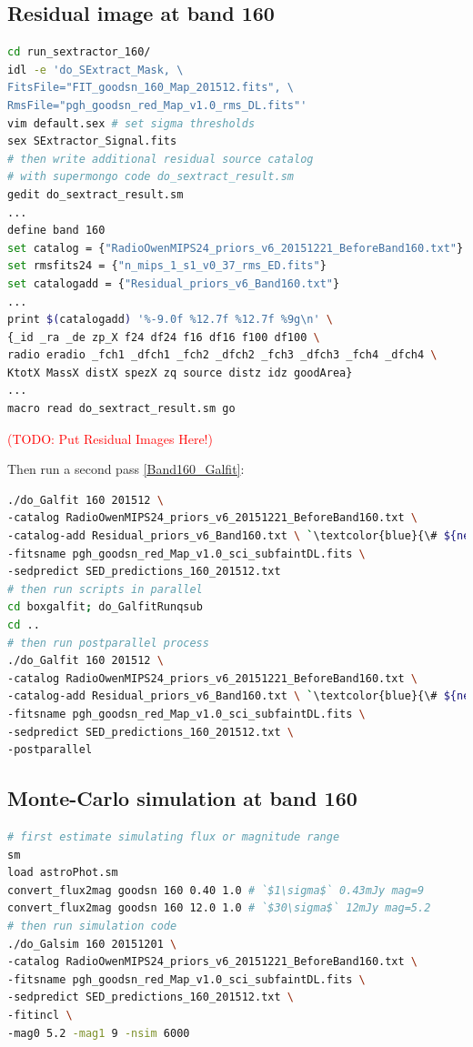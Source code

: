 \documentclass[11pt,a4paper]{article}
\begin{document}
\subsection{Residual image at band 160}
\label{Band160_Galres}

\begin{lstlisting}[language=bash]
cd run_sextractor_160/
idl -e 'do_SExtract_Mask, \
FitsFile="FIT_goodsn_160_Map_201512.fits", \
RmsFile="pgh_goodsn_red_Map_v1.0_rms_DL.fits"'
vim default.sex # set sigma thresholds
sex SExtractor_Signal.fits
# then write additional residual source catalog
# with supermongo code do_sextract_result.sm
gedit do_sextract_result.sm
...
define band 160
set catalog = {"RadioOwenMIPS24_priors_v6_20151221_BeforeBand160.txt"}
set rmsfits24 = {"n_mips_1_s1_v0_37_rms_ED.fits"}
set catalogadd = {"Residual_priors_v6_Band160.txt"}
...
print $(catalogadd) '%-9.0f %12.7f %12.7f %9g\n' \
{_id _ra _de zp_X f24 df24 f16 df16 f100 df100 \
radio eradio _fch1 _dfch1 _fch2 _dfch2 _fch3 _dfch3 _fch4 _dfch4 \
KtotX MassX distX spezX zq source distz idz goodArea}
...
macro read do_sextract_result.sm go
\end{lstlisting}

\textcolor{red}{(TODO: Put Residual Images Here!)}

Then run a second pass \ref{Band160_Galfit}: 

\begin{lstlisting}[language=bash]
./do_Galfit 160 201512 \
-catalog RadioOwenMIPS24_priors_v6_20151221_BeforeBand160.txt \
-catalog-add Residual_priors_v6_Band160.txt \ `\textcolor{blue}{\# ${new!}$}`
-fitsname pgh_goodsn_red_Map_v1.0_sci_subfaintDL.fits \
-sedpredict SED_predictions_160_201512.txt
# then run scripts in parallel 
cd boxgalfit; do_GalfitRunqsub
cd ..
# then run postparallel process
./do_Galfit 160 201512 \
-catalog RadioOwenMIPS24_priors_v6_20151221_BeforeBand160.txt \
-catalog-add Residual_priors_v6_Band160.txt \ `\textcolor{blue}{\# ${new!}$}`
-fitsname pgh_goodsn_red_Map_v1.0_sci_subfaintDL.fits \
-sedpredict SED_predictions_160_201512.txt \
-postparallel
\end{lstlisting}

\subsection{Monte-Carlo simulation at band 160}
\label{Band160_Galsim}

\begin{lstlisting}[language=bash]
# first estimate simulating flux or magnitude range
sm
load astroPhot.sm 
convert_flux2mag goodsn 160 0.40 1.0 # `$1\sigma$` 0.43mJy mag=9
convert_flux2mag goodsn 160 12.0 1.0 # `$30\sigma$` 12mJy mag=5.2
# then run simulation code
./do_Galsim 160 20151201 \
-catalog RadioOwenMIPS24_priors_v6_20151221_BeforeBand160.txt \
-fitsname pgh_goodsn_red_Map_v1.0_sci_subfaintDL.fits \
-sedpredict SED_predictions_160_201512.txt \
-fitincl \
-mag0 5.2 -mag1 9 -nsim 6000 
\end{lstlisting}
\end{document}
